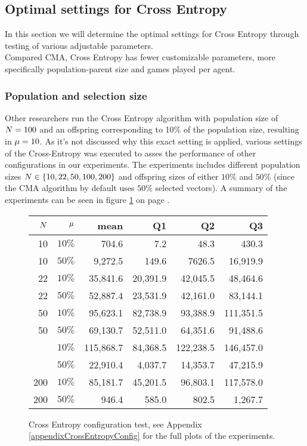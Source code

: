 \subsection{Optimal settings 
for Cross Entropy \label{optimalsettingsce}}

In this section we will determine the optimal settings for Cross Entropy through testing
of various adjustable parameters.\\
Compared CMA, Cross Entropy has fewer customizable parameters, more specifically 
population-parent size and games played per agent.

\subsubsection{Population and selection size}

Other researchers run the Cross Entropy algorithm with population size of
$N = 100$ and an offspring corresponding to 10\% of 
the population size, resulting in $\mu = 10$. As it's not 
discussed why this exact setting is applied, various settings of the 
Cross-Entropy was executed to asses the performance of other configurations
in our experiments.
The experiments includes different population sizes 
$N \in \{10, 22, 50, 100, 200\}$ and offspring 
sizes of either $10\%$ and $50\%$ (since the CMA algorithm by default
uses $50 \%$ selected vectors). 
A summary of the experiments can be seen in figure \ref{CEConfigTest}
on page \pageref{CEConfigTest}.

\begin{figure}[H]
\centering
\begin{tabular}{r r | r r r r}
$N$ & $\mu$ & mean & Q1 & Q2 & Q3\\
\hline
10 & $10\%$  & 704.6      & 7.2       & 48.3         & 430.3\\
10 & $50\%$  & 9,272.5    & 149.6     & 7626.5       & 16,919.9\\
22 & $10\%$  & 35,841.6   & 20,391.9  & 42,045.5     & 48,464.6\\
22 & $50\%$  & 52,887.4   & 23,531.9  & 42,161.0     & 83,144.1\\
50 & $10\%$  & 95,623.1   & 82,738.9  & 93,388.9     & 111,351.5\\
50 & $50\%$  & 69,130.7   & 52,511.0  & 64,351.6     & 91,488.6\\
\hdashline
100 & $10\%$ & 115,868.7  & 84,368.5  & 122,238.5    & 146,457.0\\
\hdashline
100 & $50\%$ & 22,910.4   & 4,037.7   & 14,353.7     & 47,215.9\\
200 & $10\%$ & 85,181.7   & 45,201.5  & 96,803.1     & 117,578.0\\
200 & $50\%$ & 946.4      & 585.0     & 802.5        & 1,267.7
\end{tabular}
\caption{Cross Entropy configuration test, 
see Appendix \ref{appendixCrossEntropyConfig} for the full plots 
of the experiments.  \label{CEConfigTest}}
\end{figure}

